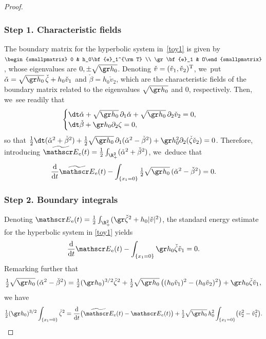 \skpt\begin{proof}\vspace*{-10pt}
\subsubsection*{Step 1. Characteristic fields}
The boundary matrix for the hyperbolic system in~\eqref{toy1} is given by
$\begin{smallpmatrix} 0 & h_0\bf{e}_1^{\rm T} \\ \gr\bf{e}_1 & O\end{smallpmatrix}$, whose eigenvalues are $0, \pm\sqrt{\gr h_0}$.
Denoting $\check{v}=(\check{v}_1,\check{v}_2)^{\rm T}$, we~put $\check{\alpha}=\sqrt{\gr h_0}\,\check{\zeta}+h_0\check{v}_1$ and $\check{\beta} = h_0\check{v}_2$,
which are the characteristic fields of the boundary matrix related to the eigenvalues $\sqrt{\gr h_0}$ and $0$, respectively.
Then, we~see readily that
\[
\begin{cases}
\dt \check{\alpha}+\sqrt{\gr h_0}\,\partial_1 \check{\alpha}+\sqrt{\gr h_0}\,\partial_2 \check{v}_2=0, \\
\dt \check{\beta}+\gr h_0\partial_2 \zeta=0,
\end{cases}
\]
so that
$\tfrac12\dt(\check{\alpha}^2+\check{\beta}^2)+\tfrac12\sqrt{\gr h_0}\,\partial_1(\check{\alpha}^2-\check{\beta}^2)+\gr h_0^2\partial_2(\check{\zeta}\check{v}_2)=0$.
Therefore, introducing $\widetilde{\mathscr E}_\mathrm{e}(t)=\frac{1}{2}\int_{\R^2_+} (\check{\alpha}^2+\check{\beta}^2)$, we~deduce that
\[
\frac{\rm d}{{\rm d}t}\widetilde{\mathscr E}_\mathrm{e}(t)-\int_{\{x_1=0\}}\tfrac12\sqrt{\gr h_0}\,(\check{\alpha}^2-\check{\beta}^2)=0.
\]

\subsubsection*{Step 2. Boundary integrals}
Denoting ${\mathscr E}_\mathrm{e}(t)=\frac{1}{2}\int_{\R_+^2} (\gr \check{\zeta}^2 +h_0 |\check{v}|^2)$,
the standard energy estimate for the hyperbolic system in \eqref{toy1} yields
\[
\frac{\rm d}{{\rm d}t} {\mathscr E}_\mathrm{e}(t) - \int_{\{x_1=0\}}{\gr h_0}\check{\zeta}\check{v}_1 = 0.
\]
Remarking further that
\[
\tfrac{1}{2}\sqrt{\gr h_0}\,(\check{\alpha}^2-\check{\beta}^2)
= \tfrac{1}{2}(\gr h_0)^{3/2} \check{\zeta}^2 + \tfrac{1}{2}\sqrt{\gr h_0}\,\big((h_0 \check{v}_1)^2-(h_0 \check{v}_2)^2\big)+\gr h_0 \check{\zeta}\check{v}_1,
\]
we have
\[
\tfrac{1}{2}(\gr h_0)^{3/2} \int_{\{x_1=0\}} \check{\zeta}^2=\frac{\rm d}{{\rm d}t}\bigl(\widetilde{\mathscr E}_\mathrm{e}(t) - {\mathscr E}_\mathrm{e}(t) \bigr)
+\tfrac{1}{2}\sqrt{\gr h_0}\,h_0^2 \int_{\{x_1=0\}} \bigl(\check{v}_2^2-\check{v}_1^2 \bigr).
\]


\end{proof}
